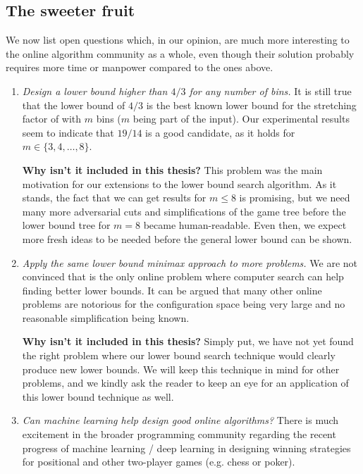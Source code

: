 \subsection{The sweeter fruit}

We now list open questions which, in our opinion, are much more
interesting to the online algorithm community as a whole, even though
their solution probably requires more time or manpower compared to the
ones above.

\begin{enumerate}

\item \textit{Design a lower bound higher than $4/3$ for any number of
bins.} It is still true that the lower bound of $4/3$ is the best
known lower bound for the stretching factor of \binstretch with $m$
bins ($m$ being part of the input). Our experimental results seem to
indicate that $19/14$ is a good candidate, as it holds for $m \in
\{3,4,\ldots,8\}$. 

\noindent\textbf{Why isn't it included in this thesis?} This problem was the
main motivation for our extensions to the lower bound search
algorithm. As it stands, the fact that we can get results for $m \le
8$ is promising, but we need many more adversarial cuts and
simplifications of the game tree before the lower bound tree for $m =
8$ became human-readable. Even then, we expect more fresh ideas to be
needed before the general lower bound can be shown.

\item \textit{Apply the same lower bound minimax approach to more
problems.} We are not convinced that \binstretch is the only online
problem where computer search can help finding better lower bounds.
It can be argued that many other online problems are notorious for the
configuration space being very large and no reasonable simplification
being known.

\noindent\textbf{Why isn't it included in this thesis?} Simply put, we have
not yet found the right problem where our lower bound search technique
would clearly produce new lower bounds. We will keep this technique in
mind for other problems, and we kindly ask the reader to keep an eye
for an application of this lower bound technique as well.

\item \textit{Can machine learning help design good online
algorithms?} There is much excitement in the broader programming
community regarding the recent progress of machine learning / deep
learning in designing winning strategies for positional and other
two-player games (e.g. chess or poker).


\end{enumerate}
